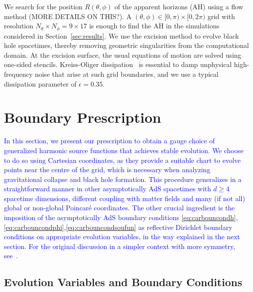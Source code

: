 \documentclass[a4paper,11pt]{article}
\begin{document}
We search for the position $R(\theta,\phi)$ of the apparent horizons (AH) using a flow method (MORE DETAILS ON THIS?). A $(\theta,\phi)\in [0,\pi)\times [0,2\pi)$ grid with resolution $N_\theta\times N_\phi=9\times 17$ is enough to find the AH in the simulations considered in Section~\ref{sec:results}. We use the excision method to evolve black hole spacetimes, thereby removing geometric singularities from the computational domain. At the excision surface, the usual equations of motion are solved using one-sided stencils. 
Kreiss-Oliger dissipation~\cite{kreiss1973methods} is essential to damp unphysical high-frequency noise that arise at such grid boundaries, and we use a typical dissipation parameter of $\epsilon=0.35$.
\fi


\section{Boundary Prescription}\label{sec:pre_sta}

\textcolor{blue}{In this section, we present our prescription to obtain a gauge choice of generalized harmonic source functions that achieves stable evolution.
We choose to do so using Cartesian coordinates, as they provide a suitable chart to evolve points near the centre of the grid, which is necessary when analyzing gravitational collapse and black hole formation. This procedure generalizes in a straightforward manner in other asymptotically AdS spacetimes with $d\geq 4$ spacetime dimensions, different coupling with matter fields and many (if not all) global or non-global Poincar\'{e} coordinates.
The other crucial ingredient is the imposition of the asymptotically AdS boundary conditions \eqref{eq:carbouncondh},\eqref{eq:carbouncondphi},\eqref{eq:carbouncondsoufun} as reflective Dirichlet boundary conditions on appropriate evolution variables, in the way explained in the next section.
For the original discussion in a simpler context with more symmetry, see~\cite{Bantilan:2012vu}. }

\subsection{Evolution Variables and Boundary Conditions}\label{subsec:cartevvarboucon}
\end{document}
